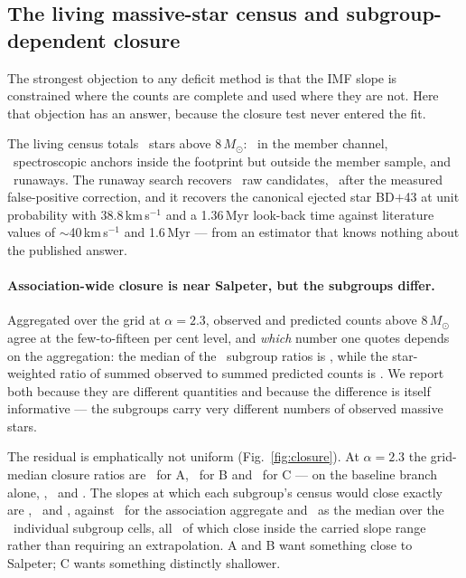 \documentclass{aa}
\begin{document}
\subsection{The living massive-star census and subgroup-dependent
closure}\label{sec:closure-result}

The strongest objection to any deficit method is that the IMF slope is
constrained where the counts are complete and used where they are not. Here that
objection has an answer, because the closure test never entered the fit.

The living census totals \livingTotal\ stars above 8\,$M_\odot$:
\livingMembers\ in the member channel, \livingOrphans\ spectroscopic anchors
inside the footprint but outside the member sample, and \runawaysBinned\
runaways. The runaway search recovers \runawaysRaw\ raw candidates,
\runawaysCorrected\ after the measured false-positive correction, and it
recovers the canonical ejected star BD$+$43\degr3654 at unit probability with
$38.8$\,km\,s$^{-1}$ and a 1.36\,Myr look-back time against literature values of
$\sim$40\,km\,s$^{-1}$ and 1.6\,Myr --- from an estimator that knows nothing
about the published answer.

\paragraph{Association-wide closure is near Salpeter, but the subgroups differ.}
Aggregated over the grid at $\alpha = 2.3$, observed and predicted counts above
8\,$M_\odot$ agree at the few-to-fifteen per cent level, and \emph{which} number
one quotes depends on the aggregation: the median of the \closureCells\ subgroup
ratios is \closureMedianRatios, while the star-weighted ratio of summed observed
to summed predicted counts is \closureWeighted. We report both because they are
different quantities and because the difference is itself informative --- the
subgroups carry very different numbers of observed massive stars.

The residual is emphatically not uniform (Fig.~\ref{fig:closure}). At
$\alpha = 2.3$ the grid-median closure ratios are \closureGridA\ for A,
\closureGridB\ for B and \closureGridC\ for C --- on the baseline branch alone,
\closureA, \closureB\ and \closureC. The slopes at which each subgroup's census
would close exactly are \closingAlphaA, \closingAlphaB\ and \closingAlphaC,
against \closingAlphaAssoc\ for the association aggregate and \closingAlpha\ as
the median over the \closureCells\ individual subgroup cells, all
\closureCellsInside\ of which close inside the carried slope range rather than
requiring an extrapolation. A and B want something close to Salpeter; C wants
something distinctly shallower.
\end{document}

